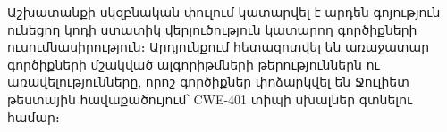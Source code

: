 {
	Աշխատանքի սկզբնական փուլում կատարվել է արդեն գոյություն ունեցող կոդի ստատիկ վերլուծություն կատարող գործիքների
	ուսումնասիրություն։ Արդյունքում հետազոտվել են առաջատար գործիքների մշակված ալգորիթմների թերություններն ու
	առավելությունները, որոշ գործիքներ փոձարկվել են Ջուլիետ թեստային հավաքածույում՝ CWE-401 տիպի սխալներ\cite{aho} գտնելու համար։
}
